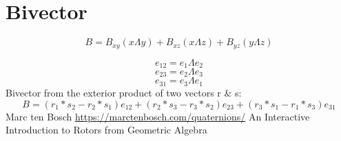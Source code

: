 
\section{Bivector}

\[B=B_{xy}(x\Lambda y)+B_{xz}(x\Lambda z)+B_{yz}(y\Lambda z)\]

\[e_{12}=e_1\Lambda e_2\]
\[e_{23}=e_2\Lambda e_3\]
\[e_{31}=e_3\Lambda e_1\]
Bivector from the exterior product of two vectors r \& s:
\[B=(r_1*s_2-r_2*s_1)e_{12}+(r_2*s_3-r_3*s_2)e_{23}+(r_3*s_1-r_1*s_3)e_{31}\]
Marc ten Bosch \url{https://marctenbosch.com/quaternions/} An Interactive Introduction to Rotors from Geometric Algebra